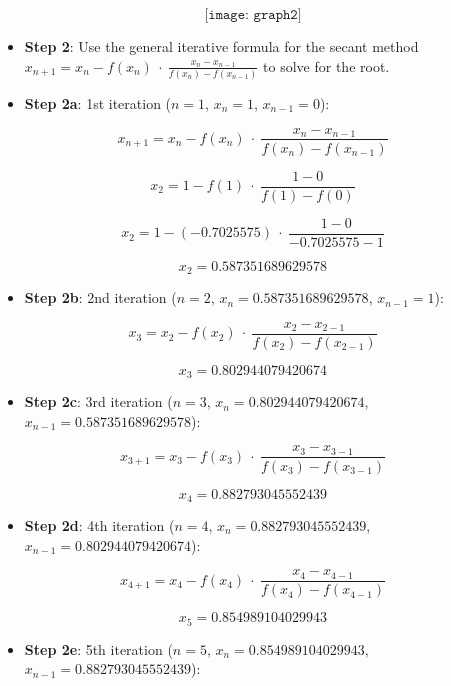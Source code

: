 \documentclass[
]{article}
\providecommand{\tightlist}{%
  \setlength{\itemsep}{0pt}\setlength{\parskip}{0pt}}
\begin{document}
\[\texttt{[image: graph2]}\]

\begin{itemize}
\item
  \textbf{Step 2}: Use the general iterative formula for the secant
  method
  \(x_{n+1} = x_{n}-f(x_{n}) \ \cdot \ \frac{x_{n} - x_{n-1}}{f(x_{n})-f(x_{n-1})}\)
  to solve for the root.
\item
  \textbf{Step 2a}: 1st iteration (\(n = 1\), \(x_{n} = 1\),
  \(x_{n-1} = 0\)):
\end{itemize}

\[x_{n+1} = x_{n}-f(x_{n}) \ \cdot \ \frac{x_{n} - x_{n-1}}{f(x_{n})-f(x_{n-1})}\]

\[x_{2} = 1-f(1) \ \cdot \ \frac{1 - 0}{f(1)-f(0)}\]

\[x_{2} = 1 - (-0.7025575) \ \cdot \ \frac{1 - 0}{-0.7025575 - 1}\]

\[x_{2} = 0.587351689629578\]

\begin{itemize}
\tightlist
\item
  \textbf{Step 2b}: 2nd iteration (\(n = 2\),
  \(x_{n} = 0.587351689629578\), \(x_{n-1} = 1\)):
\end{itemize}

\[x_{3} = x_{2}-f(x_{2}) \ \cdot \ \frac{x_{2} - x_{2-1}}{f(x_{2})-f(x_{2-1})}\]

\[x_{3} = 0.802944079420674\]

\begin{itemize}
\tightlist
\item
  \textbf{Step 2c}: 3rd iteration (\(n = 3\),
  \(x_{n} = 0.802944079420674\), \(x_{n-1} = 0.587351689629578\)):
\end{itemize}

\[x_{3+1} = x_{3}-f(x_{3}) \ \cdot \ \frac{x_{3} - x_{3-1}}{f(x_{3})-f(x_{3-1})}\]

\[x_{4} = 0.882793045552439\]

\begin{itemize}
\tightlist
\item
  \textbf{Step 2d}: 4th iteration (\(n = 4\),
  \(x_{n} = 0.882793045552439\), \(x_{n-1} = 0.802944079420674\)):
\end{itemize}

\[x_{4+1} = x_{4}-f(x_{4}) \ \cdot \ \frac{x_{4} - x_{4-1}}{f(x_{4})-f(x_{4-1})}\]

\[x_{5} = 0.854989104029943\]

\begin{itemize}
\tightlist
\item
  \textbf{Step 2e}: 5th iteration (\(n = 5\),
  \(x_{n} = 0.854989104029943\), \(x_{n-1} = 0.882793045552439\)):
\end{itemize}
\end{document}
